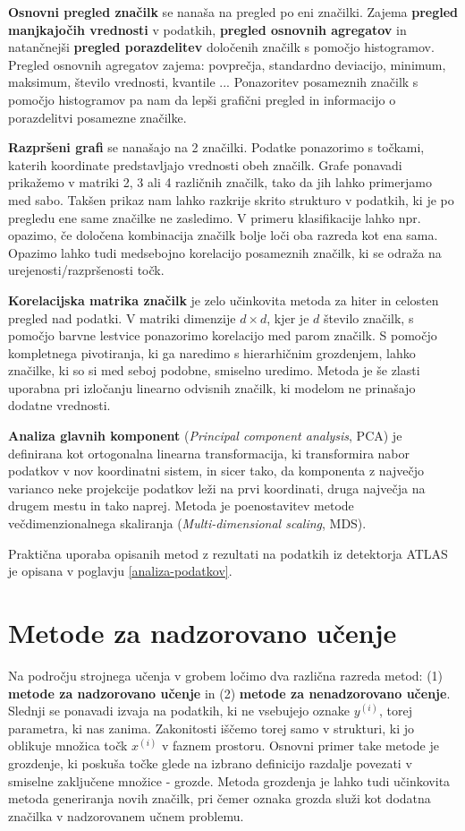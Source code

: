 \documentclass[11pt,a4paper,openany]{book}
\begin{document}
\textbf{Osnovni pregled značilk} se nanaša na pregled po eni značilki. Zajema \textbf{pregled manjkajočih vrednosti} v podatkih, \textbf{pregled osnovnih agregatov} in natančnejši \textbf{pregled porazdelitev} določenih značilk s pomočjo histogramov. Pregled osnovnih agregatov zajema: povprečja, standardno deviacijo, minimum, maksimum, število vrednosti, kvantile ... Ponazoritev posameznih značilk s pomočjo histogramov pa nam da lepši grafični pregled in informacijo o porazdelitvi posamezne značilke.

\textbf{Razpršeni grafi} se nanašajo na 2 značilki. Podatke ponazorimo s točkami, katerih koordinate predstavljajo vrednosti obeh značilk. Grafe ponavadi prikažemo v matriki 2, 3 ali 4 različnih značilk, tako da jih lahko primerjamo med sabo. Takšen prikaz nam lahko razkrije skrito strukturo v podatkih, ki je po pregledu ene same značilke ne zasledimo. V primeru klasifikacije lahko npr. opazimo, če določena kombinacija značilk bolje loči oba razreda kot ena sama. Opazimo lahko tudi medsebojno korelacijo posameznih značilk, ki se odraža na urejenosti/razpršenosti točk.

\textbf{Korelacijska matrika značilk} je zelo učinkovita metoda za hiter in celosten pregled nad podatki. V matriki dimenzije $d \times d$, kjer je $d$ število značilk, s pomočjo barvne lestvice ponazorimo korelacijo med parom značilk. S pomočjo kompletnega pivotiranja, ki ga naredimo s hierarhičnim grozdenjem, lahko značilke, ki so si med seboj podobne, smiselno uredimo. Metoda je še zlasti uporabna pri izločanju linearno odvisnih značilk, ki modelom ne prinašajo dodatne vrednosti. 

\textbf{Analiza glavnih komponent} (\textit{Principal component analysis}, PCA) je definirana kot ortogonalna linearna transformacija, ki transformira nabor podatkov v nov koordinatni sistem, in sicer tako, da komponenta z največjo varianco neke projekcije podatkov leži na prvi koordinati, druga največja na drugem mestu in tako naprej. Metoda je poenostavitev metode večdimenzionalnega skaliranja (\textit{Multi-dimensional scaling}, MDS).

Praktična uporaba opisanih metod z rezultati na podatkih iz detektorja ATLAS je opisana v poglavju \ref{analiza-podatkov}.

\section{Metode za nadzorovano učenje}

Na področju strojnega učenja v grobem ločimo dva različna razreda metod: (1) \textbf{metode za nadzorovano učenje} in (2) \textbf{metode za nenadzorovano učenje}. Slednji se ponavadi izvaja na podatkih, ki ne vsebujejo oznake $y^{(i)}$, torej parametra, ki nas zanima. Zakonitosti iščemo torej samo v strukturi, ki jo oblikuje množica točk $x^{(i)}$ v faznem prostoru. Osnovni primer take metode je grozdenje, ki poskuša točke glede na izbrano definicijo razdalje povezati v smiselne zaključene množice - grozde. Metoda grozdenja je lahko tudi učinkovita metoda generiranja novih značilk, pri čemer oznaka grozda služi kot dodatna značilka v nadzorovanem učnem problemu.
\end{document}
